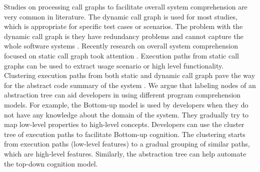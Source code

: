 Studies \cite{cornelissen2007understandingMassiveSequence, feng2018hierarchicalExecutionComprehension, reiss2005dynamicSoftwarePhases, watanabe2008featurePhaseDetection} on processing call graphs to facilitate overall system comprehension are very common in literature. The dynamic call graph is used for most studies, which is appropriate for specific test cases or scenarios. The problem with the dynamic call graph is they have redundancy problems and cannot capture the whole software systems \cite{gharibi2018automaticStaticCluster}. Recently research on overall system comprehension focused on static call graph took attention \cite{gharibi2018automaticStaticCluster, walunj2019graphevoEvolutionCall}. Execution paths from static call graphs \cite{pradel2009automaticUseageSpecification, salah2005scenariographerReverseEngineering} can be used to extract usage scenario or high level functionality. Clustering execution paths from both static and dynamic call graph pave the way for the abstract code summary of the system \cite{feng2018hierarchicalExecutionComprehension, gharibi2018automaticStaticCluster}. We argue that labeling nodes of an abstraction tree  can aid developers in using different program comprehension models. For example, the Bottom-up model is used by developers when they do not have any knowledge about the domain of the system. They gradually try to map low-level properties to high-level concepts. Developers can use the cluster tree of execution paths to facilitate Bottom-up cognition. The clustering starts from execution paths (low-level features) to a gradual grouping of similar paths, which are high-level features. Similarly, the abstraction tree can help automate the top-down cognition model. 

